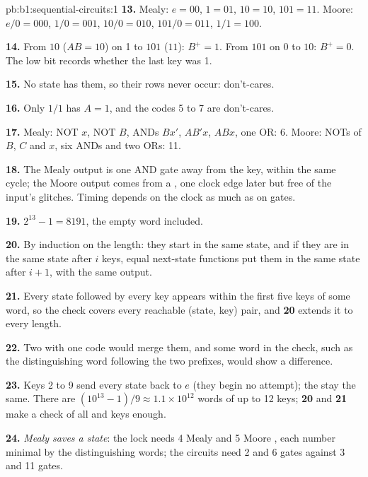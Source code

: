 \begin{solution}{pb:b1:sequential-circuits:1}
\textbf{13.} Mealy: $e = 00$, $1 = 01$, $10 = 10$, $101 = 11$. Moore: $e/0 = 000$, $1/0 = 001$, $10/0 = 010$, $101/0 = 011$,
$1/1 = 100$.

\textbf{14.} From $10$ ($AB = 10$) on 1 to $101$ ($11$): $B^+ = 1$. From $101$ on 0 to $10$: $B^+ = 0$. The low bit
records whether the last key was 1.

\textbf{15.} No state has them, so their rows never occur: don't-cares.

\textbf{16.} Only $1/1$ has $A = 1$, and the codes 5 to 7 are don't-cares.

\textbf{17.} Mealy: NOT $x$, NOT $B$, ANDs $Bx'$, $AB'x$, $ABx$, one OR: 6. Moore: NOTs of $B$, $C$ and $x$, six ANDs
and two ORs: 11.

\textbf{18.} The Mealy output is one AND gate away from the key, within the same cycle; the Moore output comes from a
, one clock edge later but free of the input's glitches. Timing depends on the clock as much as on gates.

\textbf{19.} $2^{13} - 1 = 8191$, the empty word included.

\textbf{20.} By induction on the length: they start in the same state, and if they are in the same state after $i$ keys,
equal next-state functions put them in the same state after $i + 1$, with the same output.

\textbf{21.} Every state followed by every key appears within the first five keys of some word, so the check covers every
reachable (state, key) pair, and \textbf{20} extends it to every length.

\textbf{22.} Two  with one code would merge them, and some word in the check, such as the distinguishing word
following the two prefixes, would show a difference.

\textbf{23.} Keys 2 to 9 send every state back to $e$ (they begin no attempt); the  stay the same. There are
$(10^{13} - 1) / 9 \approx 1.1 \times 10^{12}$ words of up to 12 keys; \textbf{20} and \textbf{21} make a check of all 
and keys enough.

\textbf{24.} \emph{Mealy saves a state}: the lock needs 4 Mealy  and 5 Moore , each number minimal by the
distinguishing words; the circuits need 2  and 6 gates against 3  and 11 gates.
\end{solution}
